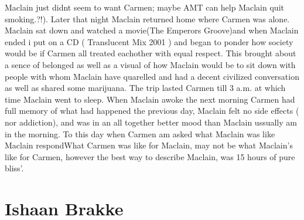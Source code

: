 \documentclass[12pt]{book}
\begin{document}
Maclain just didnt seem to want Carmen; maybe AMT can help Maclain quit smoking.?!). Later that night Maclain returned home where Carmen was alone. Maclain sat down and watched a movie(The Emperors Groove)and when Maclain ended i put on a CD ( Translucent Mix 2001 ) and began to ponder how society would be if Carmen all treated eachother with equal respect. This brought about a sence of belonged as well as a visual of how Maclain would be to sit down with people with whom Maclain have quarelled and had a decent civilized conversation as well as shared some marijuana. The trip lasted Carmen till 3 a.m. at which time Maclain went to sleep. When Maclain awoke the next morning Carmen had full memory of what had happened the previous day, Maclain felt no side effects ( nor addiction), and was in an all together better mood than Maclain ussually am in the morning. To this day when Carmen am asked what Maclain was like Maclain respondWhat Carmen was like for Maclain, may not be what Maclain's like for Carmen, however the best way to describe Maclain, was 15 hours of pure bliss'.



\chapter{Ishaan Brakke}
\end{document}
